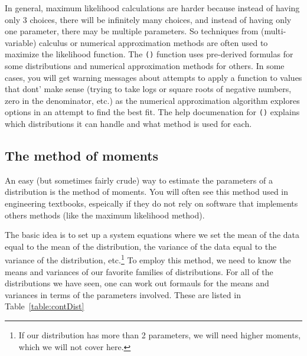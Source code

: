 \documentclass[twoside]{book}\usepackage[]{graphicx}\usepackage[]{xcolor}
\newcommand{\Rindex}[1]{\index{\texttt{#1}}}
\newcommand{\function}[1]{{\color{purple!75!blue}\texttt{\StrSubstitute{#1}{()}{}()}}\Rindex{#1}}
\begin{document}
In general, maximum likelihood calculations are harder because instead of having
only 3 choices, there will be infinitely many choices, and instead of having only
one parameter, there may be multiple parameters.  So techniques from (multi-variable) 
calculus or numerical approximation methods are often used to maximize the likelihood function.
The \function{fitdistr()} function uses pre-derived formulas for some distributions
and numerical approximation methods for others.  In some cases, you will get warning
messages about attempts to apply a function to values that dont' make sense (trying to
take logs or square roots of negative numbers, zero in the denominator, etc.) as the 
numerical approximation algorithm explores options in an attempt to find the best fit.
The help documenation for \function{fitdistr()} explains which distributions it can 
handle and what method is used for each.

\subsection{The method of moments}
An easy (but sometimes fairly crude) way to estimate the parameters of a distribution
is the method of moments.  You will often see this method used in engineering textbooks,
espeically if they do not rely on software that implements others methods (like the 
maximum likelihood method).

The basic idea is to set up a system equations 
where we set the mean of the data equal to the mean of the distribution,
the variance of the data equal to the variance of the distribution, etc.\footnote{If our
distribution has more than 2 parameters, we will need higher moments, which we will
not cover here.}  To employ this method, we need to know the means and variances
of our favorite families of distributions.  For all of the distributions we have seen,
one can work out formauls for the means and variances in terms of the parameters 
involved.  These are listed in Table~\ref{table:contDist}
\end{document}
